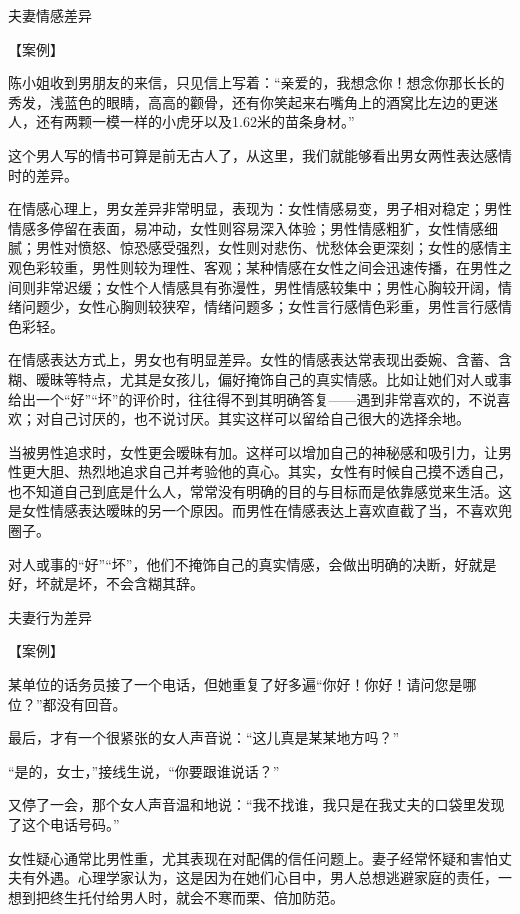 \documentclass[12pt,UTF8]{ctexbook}
\begin{document}
夫妻情感差异


【案例】

陈小姐收到男朋友的来信，只见信上写着：“亲爱的，我想念你！想念你那长长的秀发，浅蓝色的眼睛，高高的颧骨，还有你笑起来右嘴角上的酒窝比左边的更迷人，还有两颗一模一样的小虎牙以及1.62米的苗条身材。”

这个男人写的情书可算是前无古人了，从这里，我们就能够看出男女两性表达感情时的差异。

在情感心理上，男女差异非常明显，表现为：女性情感易变，男子相对稳定；男性情感多停留在表面，易冲动，女性则容易深入体验；男性情感粗犷，女性情感细腻；男性对愤怒、惊恐感受强烈，女性则对悲伤、忧愁体会更深刻；女性的感情主观色彩较重，男性则较为理性、客观；某种情感在女性之间会迅速传播，在男性之间则非常迟缓；女性个人情感具有弥漫性，男性情感较集中；男性心胸较开阔，情绪问题少，女性心胸则较狭窄，情绪问题多；女性言行感情色彩重，男性言行感情色彩轻。

在情感表达方式上，男女也有明显差异。女性的情感表达常表现出委婉、含蓄、含糊、暧昧等特点，尤其是女孩儿，偏好掩饰自己的真实情感。比如让她们对人或事给出一个“好”“坏”的评价时，往往得不到其明确答复——遇到非常喜欢的，不说喜欢；对自己讨厌的，也不说讨厌。其实这样可以留给自己很大的选择余地。

当被男性追求时，女性更会暧昧有加。这样可以增加自己的神秘感和吸引力，让男性更大胆、热烈地追求自己并考验他的真心。其实，女性有时候自己摸不透自己，也不知道自己到底是什么人，常常没有明确的目的与目标而是依靠感觉来生活。这是女性情感表达暧昧的另一个原因。而男性在情感表达上喜欢直截了当，不喜欢兜圈子。

对人或事的“好”“坏”，他们不掩饰自己的真实情感，会做出明确的决断，好就是好，坏就是坏，不会含糊其辞。





夫妻行为差异


【案例】

某单位的话务员接了一个电话，但她重复了好多遍“你好！你好！请问您是哪位？”都没有回音。

最后，才有一个很紧张的女人声音说：“这儿真是某某地方吗？”

“是的，女士，”接线生说，“你要跟谁说话？”

又停了一会，那个女人声音温和地说：“我不找谁，我只是在我丈夫的口袋里发现了这个电话号码。”

女性疑心通常比男性重，尤其表现在对配偶的信任问题上。妻子经常怀疑和害怕丈夫有外遇。心理学家认为，这是因为在她们心目中，男人总想逃避家庭的责任，一想到把终生托付给男人时，就会不寒而栗、倍加防范。
\end{document}
